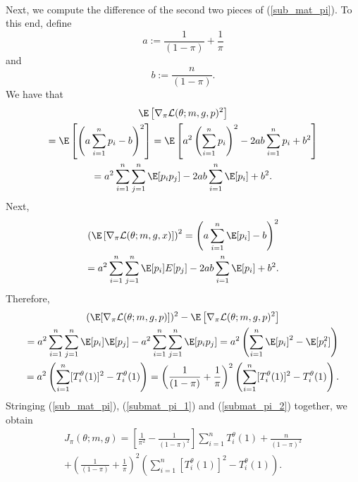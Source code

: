 \documentclass[12pt]{article}
\begin{document}
\begin{appendices}
\begin{multline}
\end{multline}
Next, we compute the difference of the second two pieces of (\ref{sub_mat_pi}). To this end, define $$a := \frac{1}{(1-\pi)} + \frac{1}{\pi}$$ and $$b := \frac{n}{(1-\pi)}.$$ We have that
\begin{multline*}
\E \left[\nabla_\pi \mathcal{L}(\theta; m, g, p)^2 \right] \\ = \E \left[ \left( a \sum_{i=1}^n p_i - b\right)^2 \right]  =  \E \left[ a^2 \left( \sum_{i=1}^n p_i \right)^2 - 2ab \sum_{i=1}^n p_i + b^2 \right] \\ = a^2 \sum_{i=1}^n \sum_{j=1}^n \E[p_i p_j] -2ab \sum_{i=1}^n \E [p_i] + b^2.
\end{multline*}
Next,
\begin{multline*}
\left( \E \left[\nabla_\pi \mathcal{L}(\theta; m, g, x) \right] \right)^2 = \left( a \sum_{i=1}^n \E [p_i] - b \right)^2 \\ = a^2 \sum_{i=1}^n \sum_{j=1}^n \E[p_i]  E[p_j] - 2ab \sum_{i=1}^n \E[p_i] + b^2.
\end{multline*}
Therefore,
\begin{multline}\label{submat_pi_2}
(\E [\nabla_\pi \mathcal{L}(\theta; m, g, p)])^2 - \E \left[\nabla_\pi \mathcal{L}(\theta; m, g, p)^2 \right] \\ = a^2 \sum_{i=1}^n \sum_{j=1}^n \E[p_i] \E[p_j] - a^2 \sum_{i=1}^n \sum_{j=1}^n \E[p_i p_j] = a^2 \left( \sum_{i=1}^n \E[p_i]^2 - \E[p_i^2]\right) \\ = a^2 \left( \sum_{i=1}^n [T^\theta_i(1)]^2 - T^\theta_i(1) \right) = \left( \frac{1}{(1 - \pi)} + \frac{1}{\pi} \right)^2 \left(\sum_{i=1}^n [T^\theta_i(1)]^2 - T^\theta_i(1) \right).
\end{multline}
Stringing (\ref{sub_mat_pi}), (\ref{submat_pi_1}) and (\ref{submat_pi_2}) together, we obtain
\begin{multline}\label{sub_mat_1_formula}
J_\pi(\theta; m, g) = 
\left[ \frac{1}{\pi^2} - \frac{1}{(1 - \pi )^2} \right] \sum_{i=1}^n T^\theta_i(1) + \frac{n}{(1-\pi )^2} \\ + \left( \frac{1}{(1 - \pi )} + \frac{1}{\pi} \right)^2 \left( \sum_{i=1}^n [T^\theta_i(1)]^2 - T^\theta_i(1) \right).
\end{multline}


\end{appendices}
\end{document}
